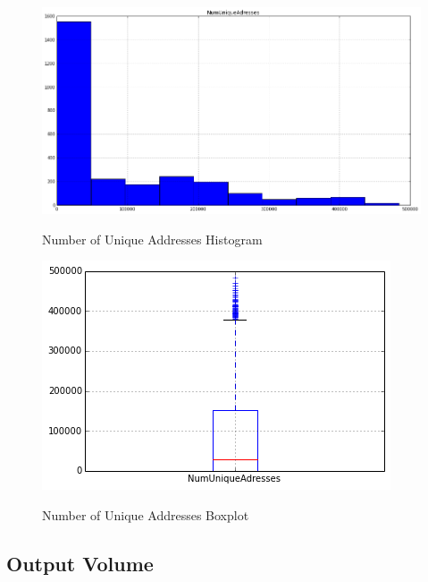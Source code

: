 \begin{figure}[bth]
  \myfloatalign
  {\includegraphics[width=1\linewidth]
    {gfx/n-unique-addresses-histogram}}
  \caption{Number of Unique Addresses
    Histogram}
  \label{fig:n-unique-addresses-histogram}
\end{figure}

\begin{figure}[bth]
  \myfloatalign
  {\includegraphics[width=1\linewidth]
    {gfx/n-unique-addresses-boxplot}}
  \caption{Number of Unique Addresses
    Boxplot}
  \label{fig:n-unique-addresses-boxplot}
\end{figure}

\clearpage

\subsection{Output Volume}
\label{sec:output-volume}

